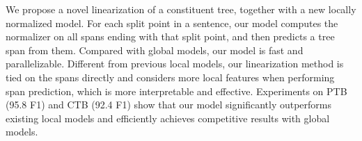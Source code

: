 We propose a novel linearization of a constituent tree, together with a new locally normalized model. For each split point in a sentence, our model computes the normalizer on all spans ending with that split point, and then predicts a tree span from them. Compared with global models, our model is fast and parallelizable. Different from previous local models, our linearization method is tied on the spans directly and considers more local features when performing span prediction, which is more interpretable and effective. Experiments on PTB (95.8 F1) and CTB (92.4 F1) show that our model significantly outperforms existing local models and efficiently achieves competitive results with global models.

